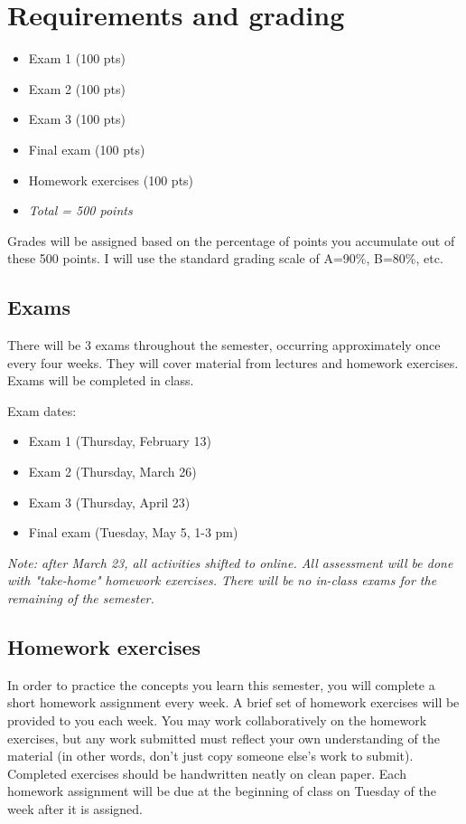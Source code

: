 \documentclass[10pt]{article}
\begin{document}
\section*{Requirements and grading}
\label{sec:org2e3da3c}
\begin{itemize}
\item Exam 1 (100 pts)
\item Exam 2 (100 pts)
\item Exam 3 (100 pts)
\item Final exam (100 pts)
\item Homework exercises (100 pts)
\item \emph{Total = 500 points}
\end{itemize}

Grades will be assigned based on the percentage of points you accumulate out of these 500 points.  I will use the standard grading scale of A=90\%, B=80\%, etc.

\subsection*{Exams}
\label{sec:org20edcd4}
There will be 3 exams throughout the semester, occurring approximately once every four weeks.  They will cover material from lectures and homework exercises. Exams will be completed in class.

Exam dates:

\begin{itemize}
\item Exam 1 (Thursday, February 13)
\item Exam 2 (Thursday, March 26)
\item Exam 3 (Thursday, April 23)
\item Final exam (Tuesday, May 5, 1-3 pm)
\end{itemize}

\emph{Note: after March 23, all activities shifted to online.  All assessment will be done with "take-home" homework exercises. There will be no in-class exams for the remaining of the semester.}

\subsection*{Homework exercises}
\label{sec:orgb7c0f10}
In order to practice the concepts you learn this semester, you will complete a short homework assignment every week. A brief set of homework exercises will be provided to you each week. You may work collaboratively on the homework exercises, but any work submitted must reflect your own understanding of the material (in other words, don't just copy someone else's work to submit). Completed exercises should be handwritten neatly on clean paper. Each homework assignment will be due at the beginning of class on Tuesday of the week after it is assigned.
\end{document}
